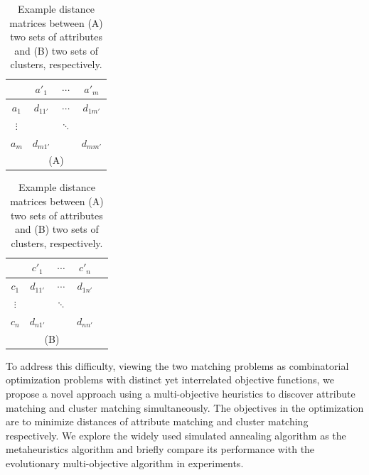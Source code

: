 \begin{table}
\begin{center}
\begin{minipage}{0.45\linewidth}\centering
\begin{tabular}{c | c c c}
	& \textbf{$a'_1$}		& $\cdots$ & \textbf{$a'_m$}\\
\hline
\textbf{$a_1$}	& $d_{11'}$ & $\cdots$  & $d_{1m'}$\\
$\vdots$        &           & $\ddots$  &\\
\textbf{$a_m$}	& $d_{m1'}$	&           & $d_{mm'}$\\
\multicolumn{4}{c}{(A)}\\
\end{tabular}
\end{minipage}
\hspace{.5cm}
\begin{minipage}{0.45\linewidth}\centering
\begin{tabular}{c | c c c c}
	& \textbf{$c'_1$}	& $\cdots$ & \textbf{$c'_n$}\\
\hline
\textbf{$c_1$}	& $d_{11'}$ & $\cdots$  & $d_{1n'}$\\
$\vdots$        &           & $\ddots$  &\\
\textbf{$c_n$}	& $d_{n1'}$	&           & $d_{nn'}$\\
\multicolumn{4}{c}{(B)}\\
\end{tabular}
\end{minipage}
\end{center}
\caption[Example distance matrices]{\label{tbl:sim_mat} Example distance matrices between (A) two sets of attributes and (B) two sets of clusters, respectively.}
\end{table}

To address this difficulty, viewing the two matching problems as combinatorial optimization problems with distinct yet interrelated objective functions, we propose a novel approach using a multi-objective heuristics to discover attribute matching and cluster matching simultaneously. The objectives in the optimization are to minimize distances of attribute matching and cluster matching respectively. We explore the widely used simulated annealing algorithm as the metaheuristics algorithm and briefly compare its performance with the evolutionary multi-objective algorithm in experiments.

